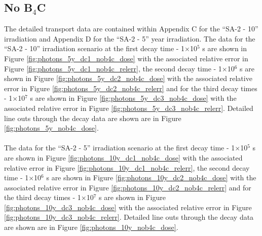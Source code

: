 \documentclass[12pt]{article}
\begin{document}
\subsection{No B$_4$C}
\label{sec:sdr_results_nob4c}
The detailed transport data are contained within Appendix C for the ``SA-2 - 10'' irradiation
and Appendix D for the ``SA-2 - 5'' year irradiation. The data for the ``SA-2 - 10'' irradiation scenario
at the first decay time - 1$\times$10$^5$ s are shown in Figure \ref{fig:photons_5y_dc1_nob4c_dose} with the
associated relative error in Figure \ref{fig:photons_5y_dc1_nob4c_relerr}, the second
decay time - 1$\times$10$^6$ s are shown in Figure \ref{fig:photons_5y_dc2_nob4c_dose} with the
associated relative error in Figure \ref{fig:photons_5y_dc2_nob4c_relerr} and for the
third decay times - 1$\times$10$^7$ s are shown in Figure \ref{fig:photons_5y_dc3_nob4c_dose} with the
associated relative error in Figure \ref{fig:photons_5y_dc3_nob4c_relerr}. Detailed line outs
through the decay data are shown are in Figure \ref{fig:photons_5y_nob4c_dose}.
\\
\\
The data for the ``SA-2 - 5'' irradiation scenario
at the first decay time - 1$\times$10$^5$ s are shown in Figure \ref{fig:photons_10y_dc1_nob4c_dose} with the
associated relative error in Figure \ref{fig:photons_10y_dc1_nob4c_relerr}, the second
decay time - 1$\times$10$^6$ s are shown in Figure \ref{fig:photons_10y_dc2_nob4c_dose} with the
associated relative error in Figure \ref{fig:photons_10y_dc2_nob4c_relerr} and for the
third decay times - 1$\times$10$^7$ s are shown in Figure \ref{fig:photons_10y_dc3_nob4c_dose} with the
associated relative error in Figure \ref{fig:photons_10y_dc3_nob4c_relerr}. Detailed line outs
through the decay data are shown are in Figure \ref{fig:photons_10y_nob4c_dose}.
\newpage
\end{document}
